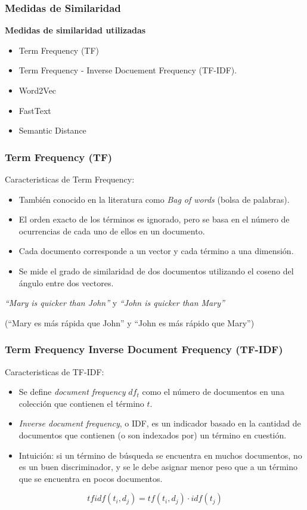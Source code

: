 \begin{frame}
	\frametitle{Medidas de Similaridad}
	\textbf{Medidas de similaridad utilizadas}
	\bigskip
	\begin{itemize}[<*>]
		\item Term Frequency (TF)
		\item Term Frequency - Inverse Docuement Frequency (TF-IDF).
		\item Word2Vec
		\item FastText
		\item Semantic Distance
	\end{itemize}
\end{frame}

\begin{frame}
	\frametitle{Term Frequency (TF)}
	Caracteristicas de Term Frequency:
	\bigskip
	\begin{itemize}[<*>]
		\item También conocido en la literatura como \textit{Bag of words} (bolsa de palabras).
		\item El orden exacto de los términos es ignorado, pero se basa en el número de ocurrencias de cada uno de ellos en un documento.
		\item Cada documento corresponde a un vector y cada término a una dimensión.
		\item Se mide el grado de similaridad de dos documentos utilizando el coseno del ángulo entre dos vectores.
	\end{itemize}

	\bigskip
	\centering
	\textit{“Mary is quicker than John”} y \textit{“John is quicker than Mary”} \\
	\medskip
	\begin{scriptsize}
		(``Mary es más rápida que John'' y ``John es más rápido que Mary'')
	\end{scriptsize}
\end{frame}

\begin{frame}
	\frametitle{Term Frequency Inverse Document Frequency (TF-IDF)}
	Caracteristicas de TF-IDF:
	\bigskip
	\begin{itemize}[<*>]
		\item Se define \textit{document frequency} \(df_t\) como el número de documentos en una colección que contienen el término \(t\).
		\item \textit{Inverse document frequency}, o IDF, es un indicador basado en la cantidad de documentos que contienen (o son indexados por) un término en cuestión.
		\item Intuición: si un término de búsqueda se encuentra en muchos documentos, no es un buen discriminador, y se le debe asignar menor peso que a un término que se encuentra en pocos documentos.
	\end{itemize}

	\centering
	\[tfidf(t_i, d_j) = tf(t_i, d_j) \cdot idf(t_j)\]
\end{frame}

